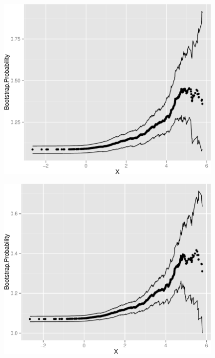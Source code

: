 \documentclass[11pt,]{article}
\begin{document}
\begin{figure}[htbp]
\centering
\includegraphics{manuscript_files/figure-latex/epa_adult_cp -1.pdf}
\caption{}
\end{figure}

\newpage

\begin{figure}[htbp]
\centering
\includegraphics{manuscript_files/figure-latex/who_rec_low1_cp-1.pdf}
\caption{}
\end{figure}

\newpage
\end{document}
